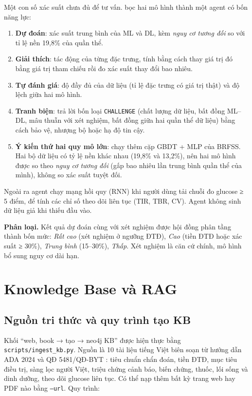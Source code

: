 Một con số xác suất chưa đủ để tư vấn.  bọc hai mô hình thành một agent có bốn năng lực:
\begin{enumerate}
  \item \textbf{Dự đoán}: xác suất trung bình của ML và DL, kèm \emph{nguy cơ tương đối} so với tỉ lệ nền 19,8\% của quần thể.
  \item \textbf{Giải thích}: tác động của từng đặc trưng, tính bằng cách thay giá trị đó bằng giá trị tham chiếu rồi đo xác suất thay đổi bao nhiêu.
  \item \textbf{Tự đánh giá}: độ đầy đủ của dữ liệu (tỉ lệ đặc trưng có giá trị thật) và độ lệch giữa hai mô hình.
  \item \textbf{Tranh biện}: trả lời bốn loại \texttt{CHALLENGE} (chất lượng dữ liệu, bất đồng ML–DL, mâu thuẫn với xét nghiệm, bất đồng giữa hai quần thể dữ liệu) bằng cách bảo vệ, nhượng bộ hoặc hạ độ tin cậy.
  \item \textbf{Ý kiến thứ hai quy mô lớn}: chạy thêm cặp GBDT + MLP của BRFSS. Hai bộ dữ liệu có tỷ lệ nền khác nhau (19,8\% và 13,2\%), nên hai mô hình được so theo \emph{nguy cơ tương đối} (gấp bao nhiêu lần trung bình quần thể của mình), không so xác suất tuyệt đối.
\end{enumerate}
Ngoài ra agent chạy mạng hồi quy (RNN) khi người dùng tải chuỗi đo glucose ≥ 5 điểm, để tính các chỉ số theo dõi liên tục (TIR, TBR, CV). Agent không sinh dữ liệu giả khi thiếu đầu vào.

\textbf{Phân loại.} Kết quả dự đoán cùng với xét nghiệm được hội đồng phân tầng thành bốn mức: \emph{Rất cao} (xét nghiệm ở ngưỡng ĐTĐ), \emph{Cao} (tiền ĐTĐ hoặc xác suất ≥ 30\%), \emph{Trung bình} (15–30\%), \emph{Thấp}. Xét nghiệm là căn cứ chính, mô hình bổ sung nguy cơ dài hạn.

\section{Knowledge Base và RAG}
\label{sec:kb}

\subsection{Nguồn tri thức và quy trình tạo KB}

Khối ``web, book → tạo → neo4j KB'' được hiện thực bằng \texttt{scripts/ingest\_kb.py}. Nguồn là 10 tài liệu tiếng Việt biên soạn từ hướng dẫn ADA 2024 \cite{ada2024} và QĐ 5481/QĐ-BYT \cite{byt5481}: tiêu chuẩn chẩn đoán, tiền ĐTĐ, mục tiêu điều trị, sàng lọc người Việt, triệu chứng cảnh báo, biến chứng, thuốc, lối sống và dinh dưỡng, theo dõi glucose liên tục. Có thể nạp thêm bất kỳ trang web hay PDF nào bằng \texttt{--url}. Quy trình:

